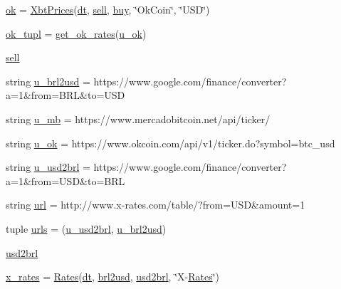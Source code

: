 \begin{DoxyCompactItemize}
\item 
\hyperlink{namespaceraw__urlparser_aa0dcadbc04ec5d09f7a2dabb865000c8}{ok} = \hyperlink{classraw__urlparser_1_1_xbt_prices}{Xbt\+Prices}(\hyperlink{namespaceraw__urlparser_acbaf2eef75f4aa43e1f6659c0fd34836}{dt}, \hyperlink{namespaceraw__urlparser_a9f1ba2a5cd520bb41ac4bee751047679}{sell}, \hyperlink{namespaceraw__urlparser_a2b9c66c8d5157cd95ecb738719c8a873}{buy}, \char`\"{}Ok\+Coin\char`\"{}, \char`\"{}U\+SD\char`\"{})
\item 
\hyperlink{namespaceraw__urlparser_a511386d80b04970417c26b6493bd2475}{ok\+\_\+tupl} = \hyperlink{namespaceraw__urlparser_aaf342c097e3df48d46b7296e8177d737}{get\+\_\+ok\+\_\+rates}(\hyperlink{namespaceraw__urlparser_a22c1a17803a88426d38d70ad6d4290d2}{u\+\_\+ok})
\item 
\hyperlink{namespaceraw__urlparser_a9f1ba2a5cd520bb41ac4bee751047679}{sell}
\item 
string \hyperlink{namespaceraw__urlparser_a876711ddd7ebb3991a35cc1768d1d22c}{u\+\_\+brl2usd} = \textquotesingle{}https\+://www.\+google.\+com/finance/converter?a=1\&from=B\+RL\&to=U\+SD\textquotesingle{}
\item 
string \hyperlink{namespaceraw__urlparser_a9a840f174b92a24c415b88c87e84b73d}{u\+\_\+mb} = \textquotesingle{}https\+://www.\+mercadobitcoin.\+net/api/ticker/\textquotesingle{}
\item 
string \hyperlink{namespaceraw__urlparser_a22c1a17803a88426d38d70ad6d4290d2}{u\+\_\+ok} = \textquotesingle{}https\+://www.\+okcoin.\+com/api/v1/ticker.\+do?symbol=btc\+\_\+usd\textquotesingle{}
\item 
string \hyperlink{namespaceraw__urlparser_a63e1f0abe7b1f43c4891ce9aec98261d}{u\+\_\+usd2brl} = \textquotesingle{}https\+://www.\+google.\+com/finance/converter?a=1\&from=U\+SD\&to=B\+RL\textquotesingle{}
\item 
string \hyperlink{namespaceraw__urlparser_a9242b893f4f49ef7cc0d4e599b70daa4}{url} = \textquotesingle{}http\+://www.\+x-\/rates.\+com/table/?from=U\+SD\&amount=1\textquotesingle{}
\item 
tuple \hyperlink{namespaceraw__urlparser_aded92a1146e1ce1f14fd79a361f947f9}{urls} = (\hyperlink{namespaceraw__urlparser_a63e1f0abe7b1f43c4891ce9aec98261d}{u\+\_\+usd2brl}, \hyperlink{namespaceraw__urlparser_a876711ddd7ebb3991a35cc1768d1d22c}{u\+\_\+brl2usd})
\item 
\hyperlink{namespaceraw__urlparser_adb724d2d0b7c561e8b0c53a42831efce}{usd2brl}
\item 
\hyperlink{namespaceraw__urlparser_a76bac0500149c0b7dc5e8dfef56f05c3}{x\+\_\+rates} = \hyperlink{classraw__urlparser_1_1_rates}{Rates}(\hyperlink{namespaceraw__urlparser_acbaf2eef75f4aa43e1f6659c0fd34836}{dt}, \hyperlink{namespaceraw__urlparser_ae7e1c02df9ab0102e017e31885aa6431}{brl2usd}, \hyperlink{namespaceraw__urlparser_adb724d2d0b7c561e8b0c53a42831efce}{usd2brl}, \char`\"{}X-\/\hyperlink{classraw__urlparser_1_1_rates}{Rates}\char`\"{})
\end{DoxyCompactItemize}


